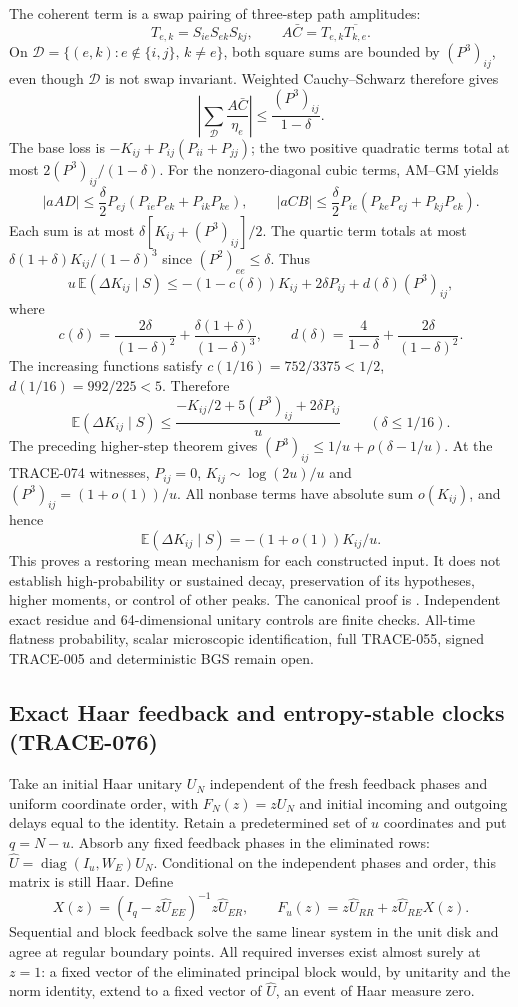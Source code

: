 The coherent term is a swap pairing of three-step path amplitudes:
\[
 T_{e,k}=S_{ie}S_{ek}S_{kj},\qquad A\bar C=T_{e,k}\overline{T_{k,e}}.
\]
On $\mathcal D=\{(e,k):e\notin\{i,j\},\,k\ne e\}$, both square sums
are bounded by $(P^3)_{ij}$, even though $\mathcal D$ is not swap invariant.
Weighted Cauchy--Schwarz therefore gives
\[
 \left|\sum_{\mathcal D}\frac{A\bar C}{\eta_e}\right|
 \le\frac{(P^3)_{ij}}{1-\delta}.
\]
The base loss is $-K_{ij}+P_{ij}(P_{ii}+P_{jj})$; the two positive
quadratic terms total at most $2(P^3)_{ij}/(1-\delta)$.
For the nonzero-diagonal cubic terms, AM--GM yields
\[
 |aAD|\le\frac\delta2 P_{ej}(P_{ie}P_{ek}+P_{ik}P_{ke}),\qquad
 |aCB|\le\frac\delta2 P_{ie}(P_{ke}P_{ej}+P_{kj}P_{ek}).
\]
Each sum is at most $\delta[K_{ij}+(P^3)_{ij}]/2$.
The quartic term totals at most
$\delta(1+\delta)K_{ij}/(1-\delta)^3$ since $(P^2)_{ee}\le\delta$.
Thus
\[
 u\,\mathbb E(\Delta K_{ij}\mid S)
 \le-(1-c(\delta))K_{ij}+2\delta P_{ij}+d(\delta)(P^3)_{ij},
\]
where
\[
 c(\delta)=\frac{2\delta}{(1-\delta)^2}
             +\frac{\delta(1+\delta)}{(1-\delta)^3},\qquad
 d(\delta)=\frac4{1-\delta}+\frac{2\delta}{(1-\delta)^2}.
\]
The increasing functions satisfy
$c(1/16)=752/3375<1/2$, $d(1/16)=992/225<5$. Therefore
\[
 \mathbb E(\Delta K_{ij}\mid S)
 \le\frac{-K_{ij}/2+5(P^3)_{ij}+2\delta P_{ij}}u
 \qquad(\delta\le1/16).
\]
The preceding higher-step theorem gives
$(P^3)_{ij}\le1/u+\rho(\delta-1/u)$.
At the TRACE-074 witnesses, $P_{ij}=0$, $K_{ij}\sim\log(2u)/u$ and
$(P^3)_{ij}=(1+o(1))/u$. All nonbase terms have absolute sum
$o(K_{ij})$, and hence
\[
 \mathbb E(\Delta K_{ij}\mid S)=-(1+o(1))K_{ij}/u.
\]
This proves a restoring mean mechanism for each constructed input.
It does not establish high-probability or sustained decay, preservation
of its hypotheses, higher moments, or control of other peaks.
The canonical proof is
.
Independent exact residue and 64-dimensional unitary controls are finite
checks. All-time flatness probability, scalar microscopic identification,
full TRACE-055, signed TRACE-005 and deterministic BGS remain open.

\subsection{Exact Haar feedback and entropy-stable clocks (TRACE-076)}
\label{sec:haar-feedback-20261012}
Take an initial Haar unitary $U_N$ independent of the fresh feedback
phases and uniform coordinate order, with $F_N(z)=zU_N$ and initial
incoming and outgoing delays equal to the identity. Retain a
predetermined set of $u$ coordinates and put $q=N-u$. Absorb any fixed
feedback phases in the eliminated rows:
$\widehat U=\operatorname{diag}(I_u,W_E)U_N$. Conditional on the independent
phases and order, this matrix is still Haar. Define
\[
 X(z)=(I_q-z\widehat U_{EE})^{-1}z\widehat U_{ER},\qquad
 F_u(z)=z\widehat U_{RR}+z\widehat U_{RE}X(z).
\]
Sequential and block feedback solve the same linear system in the
unit disk and agree at regular boundary points. All required inverses
exist almost surely at $z=1$: a fixed vector of the eliminated principal
block would, by unitarity and the norm identity, extend to a fixed
vector of $\widehat U$, an event of Haar measure zero.

